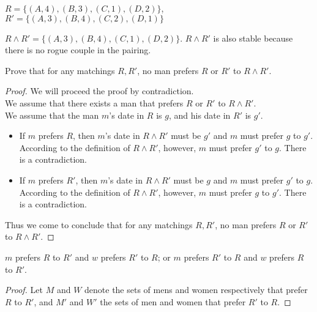 \documentclass[11pt]{article}
\begin{document}
    \begin{Parts}

        \Part $R=\{(A,4),(B,3),(C,1),(D,2)\}$, $R'=\{(A,3),(B,4),(C,2),(D,1)\}$

        \begin{Answer}
            $R \land R' = \{(A,3),(B,4),(C,1),(D,2)\}$. $R \land R'$ is also stable because there is no rogue couple in the pairing. 
        \end{Answer}

        \Part Prove that for any matchings $R,R'$, no man prefers $R$ or $R'$ to $R \land R'$. 

        \begin{Answer}
            \begin{proof}
                We will proceed the proof by contradiction. \\
                We assume that there exists a man that prefers $R$ or $R'$ to $R \land R'$. \\
                We assume that the man $m$'s date in $R$ is $g$, and his date in $R'$ is $g'$. 
                \begin{itemize}
                    \item If $m$ prefers $R$, then $m$'s date in $R \land R'$ must be $g'$ and $m$ must prefer $g$ to $g'$. According to 
                    the definition of $R \land R'$, however, $m$ must prefer $g'$ to $g$. There is a contradiction. 
                    \item If $m$ prefers $R'$, then $m$'s date in $R \land R'$ must be $g$ and $m$ must prefer $g'$ to $g$. According to 
                    the definition of $R \land R'$, however, $m$ must prefer $g$ to $g'$. There is a contradiction. 
                \end{itemize}
                Thus we come to conclude that for any matchings $R,R'$, no man prefers $R$ or $R'$ to $R \land R'$. 
            \end{proof}
        \end{Answer}

        \Part $m$ prefers $R$ to $R'$ and $w$ prefers $R'$ to $R$; or $m$ prefers $R'$ to $R$ and $w$ prefers $R$ to $R'$.
        
        \begin{Answer}
            \begin{proof}
                Let $M$ and $W$ denote the sets of mens and women respectively that prefer $R$ to $R'$, and $M'$ and $W'$ the sets of 
                men and women that prefer $R'$ to $R$.


\end{proof}
\end{Answer}
\end{Parts}
\end{document}
